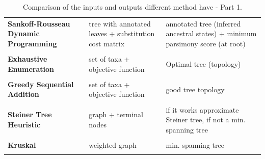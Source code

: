 \begin{table}[H]
\begin{tabular}{p{5cm}p{4cm}p{4cm}}
        \textbf{Sankoff-Rousseau Dynamic Programming} & tree with annotated leaves +  substitution cost matrix & annotated tree (inferred ancestral states) + minimum parsimony score (at root) \\ \\
        \textbf{Exhaustive Enumeration} & set of taxa + objective function & Optimal tree (topology) \\ \\
        \textbf{Greedy Sequential Addition} & set of taxa + objective function & good tree topology \\ \\
        \textbf{Steiner Tree Heuristic} & graph + terminal nodes & if it works approximate Steiner tree, if not a min. spanning tree \\ \\
        \textbf{Kruskal} &weighted graph & min. spanning tree \\ \\
\end{tabular}

    \caption{Comparison of the inputs and outputs different method have - Part 1.}
    \label{tab:my_label}
\end{table}
